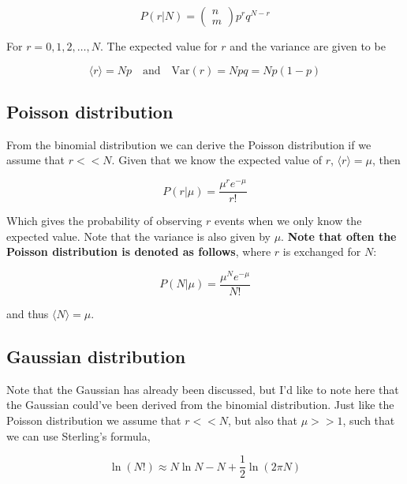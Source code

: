 \documentclass[a4paper]{article}
\begin{document}
\begin{equation}
	P(r|N)=\begin{pmatrix} n\\ m \end{pmatrix}p^rq^{N-r}
\end{equation} 

For $r=0,1,2,\dots,N$. The expected value for $r$ and the variance are given to be

\begin{equation}
	\langle r\rangle = Np\quad\text{and}\quad \text{Var}(r)=Npq=Np(1-p)
\end{equation}

\subsection{Poisson distribution}

From the binomial distribution we can derive the Poisson distribution if we assume that $r<<N$. Given that we know the expected value of $r$, $\langle r\rangle=\mu$, then 

\begin{equation}
	P(r|\mu)=\frac{\mu^r e^{-\mu}}{r!}
\end{equation}

Which gives the probability of observing $r$ events when we only know the expected value. Note that the variance is also given by $\mu$. \textbf{Note that often the Poisson distribution is denoted as follows}, where $r$ is exchanged for $N$:

\begin{equation}
P(N|\mu)=\frac{\mu^N e^{-\mu}}{N!}
\end{equation}

and thus $\langle N\rangle=\mu$.

\subsection{Gaussian distribution}

Note that the Gaussian has already been discussed, but I'd like to note here that the Gaussian could've been derived from the binomial distribution. Just like the Poisson distribution we assume that $r<<N$, but also that $\mu>>1$, such that we can use Sterling's formula,

\begin{equation}
	\ln(N!)\approx N\ln N-N+\frac{1}{2}\ln(2\pi N)
\end{equation}
\end{document}

